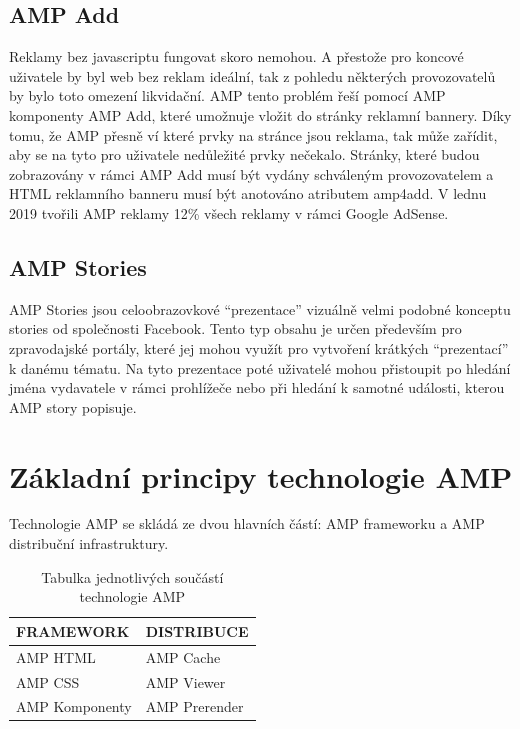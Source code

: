 \subsection*{AMP Add}
Reklamy bez javascriptu fungovat skoro nemohou. A přestože pro koncové uživatele by byl web bez reklam ideální, tak z pohledu některých provozovatelů by bylo toto omezení likvidační. AMP tento problém řeší pomocí AMP komponenty AMP Add, které umožnuje vložit do stránky reklamní bannery. Díky tomu, že AMP přesně ví které prvky na stránce jsou reklama, tak může zařídit, aby se na tyto pro uživatele nedůležité prvky nečekalo. Stránky, které budou zobrazovány v rámci AMP Add musí být vydány schváleným provozovatelem a HTML reklamního banneru musí být anotováno atributem amp4add\cite[Ch.\ 6, p.\ 280]{VzhuruDoAMP}.
V lednu 2019 tvořili AMP reklamy 12\% všech reklamy v rámci Google AdSense\cite{abner_2019}.
\subsection*{AMP Stories}
AMP Stories jsou celoobrazovkové “prezentace” vizuálně velmi podobné konceptu stories od společnosti Facebook. Tento typ obsahu je určen především pro zpravodajské portály, které jej mohou využít pro vytvoření krátkých
“prezentací” k danému tématu. Na tyto prezentace poté uživatelé mohou přistoupit po hledání jména
vydavatele v rámci prohlížeče nebo při hledání k samotné události, kterou AMP story popisuje\cite[Ch.\ 6, p.\ 290]{VzhuruDoAMP}.

\section{Základní principy technologie AMP}
Technologie AMP se skládá ze dvou hlavních částí: AMP frameworku a AMP distribuční infrastruktury. 

\begin{table}[H]
	\caption{Tabulka jednotlivých součástí technologie AMP} 
	\centering
	\begin{tabular}{m{15em} | m{15em}}
		\toprule
		\cmidrule(r){1-2}
		FRAMEWORK & DISTRIBUCE \\
		\midrule
		AMP HTML & AMP Cache \\
		AMP CSS & AMP Viewer \\
		AMP Komponenty & AMP Prerender \\
		\bottomrule
	\end{tabular}
	\label{tab:Součásti technologie AMP}
\end{table}

